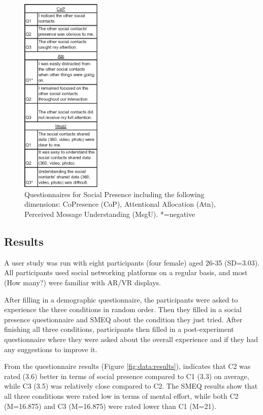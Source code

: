 \begin{figure}[ht]
    \centering
    \includegraphics[width=1.5in]{images/chi/images-02.eps}
    \caption{Questionnaires for Social Presence including the following dimensions: CoPresence (CoP), Attentional Allocation (Atn), Perceived Message Understanding (MsgU). *=negative} 
      \label{tbl:questions}
\end{figure}

\subsection{Results}

A user study was run with eight participants (four female) aged 26-35 (SD=3.03). All participants used social networking platforms on a regular basis, and most (How many?) were familiar with AR/VR displays. 

After filling in a demographic questionnaire, the participants were asked to experience the three conditions in random order. Then they filled in a social presence questionnaire and SMEQ about the condition they just tried. After finishing all three conditions, participants then filled in a post-experiment questionnaire where they were asked about the overall experience and if they had any suggestions to improve it. 

From the questionnaire results (Figure \ref{fig:data:results}), indicates that C2 was rated (3.6) better in terms of social presence compared to C1 (3.3) on average, while C3 (3.5) was relatively close compared to C2. The SMEQ results show that all three conditions were rated low in terms of mental effort, while both C2 (M=16.875) and C3 (M=16.875) were rated lower than C1 (M=21).

